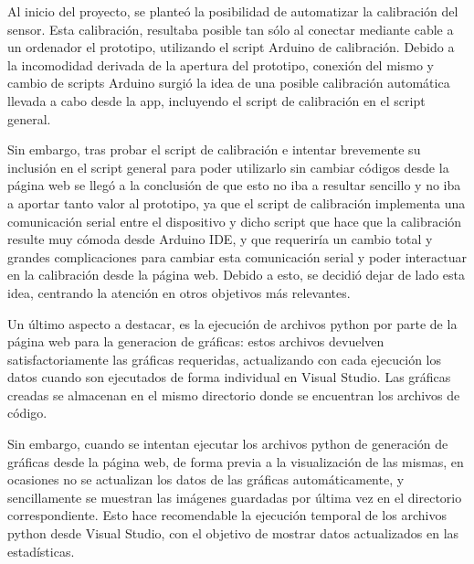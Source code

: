Al inicio del proyecto, se planteó la posibilidad de automatizar la calibración del sensor. Esta calibración, resultaba posible tan sólo al conectar mediante cable a un ordenador el prototipo, utilizando el script Arduino de calibración. Debido a la incomodidad derivada de la apertura del prototipo, conexión del mismo y cambio de scripts Arduino surgió la idea de una posible calibración automática llevada a cabo desde la app, incluyendo el script de calibración en el script general.

Sin embargo, tras probar el script de calibración e intentar brevemente su inclusión en el script general para poder utilizarlo sin cambiar códigos desde la página web se llegó a la conclusión de que esto no iba a resultar sencillo y no iba a aportar tanto valor al prototipo, ya que el script de calibración implementa una comunicación serial entre el dispositivo y dicho script que hace que la calibración resulte muy cómoda desde Arduino IDE, y que requeriría un cambio total y grandes complicaciones para cambiar esta comunicación serial y poder interactuar en la calibración desde la página web. Debido a esto, se decidió dejar de lado esta idea, centrando la atención en otros objetivos más relevantes.

Un último aspecto a destacar, es la ejecución de archivos python por parte de la página web para la generacion de gráficas: estos archivos devuelven satisfactoriamente las gráficas requeridas, actualizando con cada ejecución los datos cuando son ejecutados de forma individual en Visual Studio. Las gráficas creadas se almacenan en el mismo directorio donde se encuentran los archivos de código. 

Sin embargo, cuando se intentan ejecutar los archivos python de generación de gráficas desde la página web, de forma previa a la visualización de las mismas, en ocasiones no se actualizan los datos de las gráficas automáticamente, y sencillamente se muestran las imágenes guardadas por última vez en el directorio correspondiente. Esto hace recomendable la ejecución temporal de los archivos python desde Visual Studio, con el objetivo de mostrar datos actualizados en las estadísticas.





